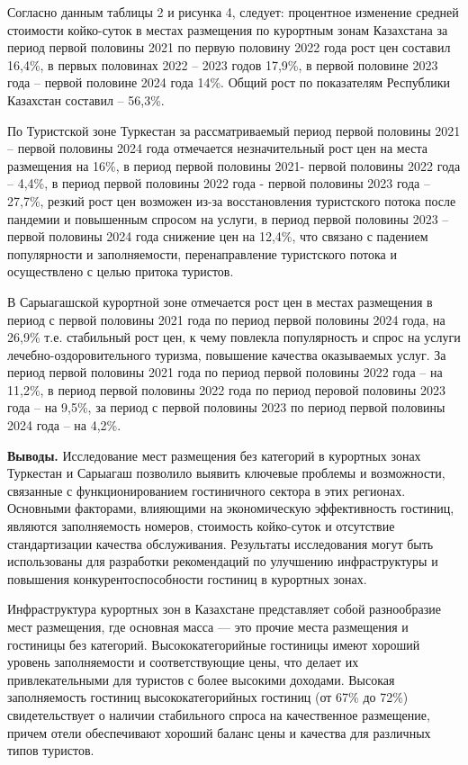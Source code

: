\begin{multicols}{2}
Согласно данным таблицы 2 и рисунка 4, следует: процентное изменение
средней стоимости койко-суток в местах размещения по курортным зонам
Казахстана за период первой половины 2021 по первую половину 2022 года
рост цен составил 16,4\%, в первых половинах 2022 -- 2023 годов 17,9\%,
в первой половине 2023 года -- первой половине 2024 года 14\%. Общий
рост по показателям Республики Казахстан составил -- 56,3\%.

По Туристской зоне Туркестан за рассматриваемый период первой половины
2021 -- первой половины 2024 года отмечается незначительный рост цен на
места размещения на 16\%, в период первой половины 2021- первой половины
2022 года -- 4,4\%, в период первой половины 2022 года - первой половины
2023 года -- 27,7\%, резкий рост цен возможен из-за восстановления
туристского потока после пандемии и повышенным спросом на услуги, в
период первой половины 2023 -- первой половины 2024 года снижение цен на
12,4\%, что связано с падением популярности и заполняемости,
перенаправление туристского потока и осуществлено с целью притока
туристов.

В Сарыагашской курортной зоне отмечается рост цен в местах размещения в
период с первой половины 2021 года по период первой половины 2024 года,
на 26,9\% т.е. стабильный рост цен, к чему повлекла популярность и спрос
на услуги лечебно-оздоровительного туризма, повышение качества
оказываемых услуг. За период первой половины 2021 года по период первой
половины 2022 года -- на 11,2\%, в период первой половины 2022 года по
период перовой половины 2023 года -- на 9,5\%, за период с первой
половины 2023 по период первой половины 2024 года -- на 4,2\%.

{\bfseries Выводы.} Исследование мест размещения без категорий в курортных
зонах Туркестан и Сарыагаш позволило выявить ключевые проблемы и
возможности, связанные с функционированием гостиничного сектора в этих
регионах. Основными факторами, влияющими на экономическую эффективность
гостиниц, являются заполняемость номеров, стоимость койко-суток и
отсутствие стандартизации качества обслуживания. Результаты исследования
могут быть использованы для разработки рекомендаций по улучшению
инфраструктуры и повышения конкурентоспособности гостиниц в курортных
зонах.

Инфраструктура курортных зон в Казахстане представляет собой
разнообразие мест размещения, где основная масса --- это прочие места
размещения и гостиницы без категорий. Высококатегорийные гостиницы имеют
хороший уровень заполняемости и соответствующие цены, что делает их
привлекательными для туристов с более высокими доходами. Высокая
заполняемость гостиниц высококатегорийных гостиниц (от 67\% до 72\%)
свидетельствует о наличии стабильного спроса на качественное размещение,
причем отели обеспечивают хороший баланс цены и качества для различных
типов туристов.


\end{multicols}
